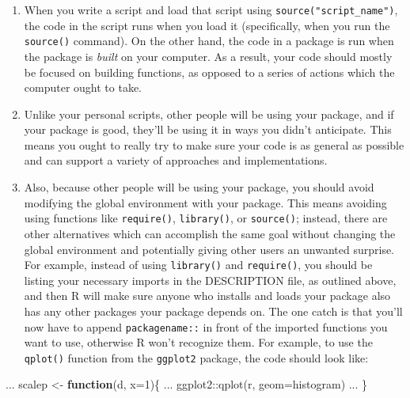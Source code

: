 \documentclass[
]{book}
\newenvironment{Shaded}{\begin{snugshade}}{\end{snugshade}}
\newcommand{\AttributeTok}[1]{\textcolor[rgb]{0.77,0.63,0.00}{#1}}
\newcommand{\ControlFlowTok}[1]{\textcolor[rgb]{0.13,0.29,0.53}{\textbf{#1}}}
\newcommand{\DecValTok}[1]{\textcolor[rgb]{0.00,0.00,0.81}{#1}}
\newcommand{\FunctionTok}[1]{\textcolor[rgb]{0.00,0.00,0.00}{#1}}
\newcommand{\NormalTok}[1]{#1}
\newcommand{\OtherTok}[1]{\textcolor[rgb]{0.56,0.35,0.01}{#1}}
\newcommand{\SpecialCharTok}[1]{\textcolor[rgb]{0.00,0.00,0.00}{#1}}
\newcommand{\StringTok}[1]{\textcolor[rgb]{0.31,0.60,0.02}{#1}}
\providecommand{\tightlist}{%
  \setlength{\itemsep}{0pt}\setlength{\parskip}{0pt}}
\begin{document}
\begin{enumerate}
\def\labelenumi{\arabic{enumi}.}
\tightlist
\item
  When you write a script and load that script using \texttt{source("script\_name")}, the code in the script runs when you load it (specifically, when you run the \texttt{source()} command). On the other hand, the code in a package is run when the package is \emph{built} on your computer. As a result, your code should mostly be focused on building functions, as opposed to a series of actions which the computer ought to take.
\item
  Unlike your personal scripts, other people will be using your package, and if your package is good, they'll be using it in ways you didn't anticipate. This means you ought to really try to make sure your code is as general as possible and can support a variety of approaches and implementations.
\item
  Also, because other people will be using your package, you should avoid modifying the global environment with your package. This means avoiding using functions like \texttt{require()}, \texttt{library()}, or \texttt{source()}; instead, there are other alternatives which can accomplish the same goal without changing the global environment and potentially giving other users an unwanted surprise. For example, instead of using \texttt{library()} and \texttt{require()}, you should be listing your necessary imports in the DESCRIPTION file, as outlined above, and then R will make sure anyone who installs and loads your package also has any other packages your package depends on. The one catch is that you'll now have to append \texttt{packagename::} in front of the imported functions you want to use, otherwise R won't recognize them. For example, to use the \texttt{qplot()} function from the \texttt{ggplot2} package, the code should look like:
\end{enumerate}

\begin{Shaded}
\begin{Highlighting}[]
\NormalTok{ ...}
\NormalTok{scalep }\OtherTok{\textless{}{-}} \ControlFlowTok{function}\NormalTok{(d, }\AttributeTok{x=}\DecValTok{1}\NormalTok{)\{}
\NormalTok{ ...}
\NormalTok{  ggplot2}\SpecialCharTok{::}\FunctionTok{qplot}\NormalTok{(r, }\AttributeTok{geom=}\StringTok{\textquotesingle{}histogram\textquotesingle{}}\NormalTok{)}
\NormalTok{ ...}
\NormalTok{\}}
\end{Highlighting}
\end{Shaded}
\end{document}
